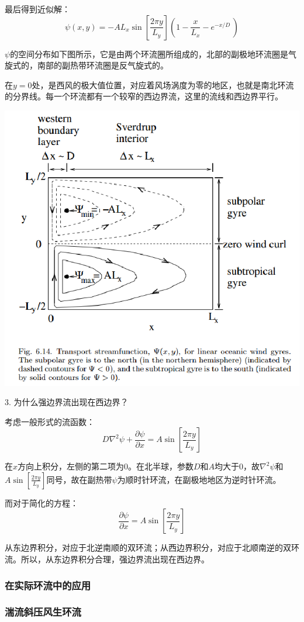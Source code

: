 \documentclass{article}
\begin{document}
最后得到近似解：
$$\psi \left( x,y \right)=-A{{L}_{x}}\sin \left[ \frac{2\pi y}{{{L}_{y}}} \right]\left( 1-\frac{x}{{{L}_{x}}}-{{e}^{{-x}/{D}\;}} \right)$$

$\psi$的空间分布如下图所示，它是由两个环流圈所组成的，北部的副极地环流圈是气旋式的，南部的副热带环流圈是反气旋式的。

在$y=0$处，是西风的极大值位置，对应着风场涡度为零的地区，也就是南北环流的分界线。每一个环流都有一个较窄的西边界流，这里的流线和西边界平行。
\begin{center}
    \includegraphics[width=0.5\linewidth]{Fig5_4.png}
\end{center}

3. 为什么强边界流出现在西边界？

考虑一般形式的流函数：
$$D{{\nabla }^{2}}\psi +\frac{\partial \psi }{\partial x}=A\sin [ \frac{2\pi y}{{{L}_{y}}}] $$

在$x$方向上积分，左侧的第二项为$0$。在北半球，参数$D$和$A$均大于$0$，故${\nabla }^{2}\psi$和$A\sin [ \frac{2\pi y}{{{L}_{y}}}]$同号，故在副热带$\psi$为顺时针环流，在副极地地区为逆时针环流。

而对于简化的方程：
$$\frac{\partial \psi }{\partial x}=A\sin \left[ \frac{2\pi y}{{{L}_{y}}} \right]$$

从东边界积分，对应于北逆南顺的双环流；从西边界积分，对应于北顺南逆的双环流。所以，从东边界积分合理，强边界流出现在西边界。

\subsubsection{在实际环流中的应用}
\subsubsection{湍流斜压风生环流}
\end{document}
